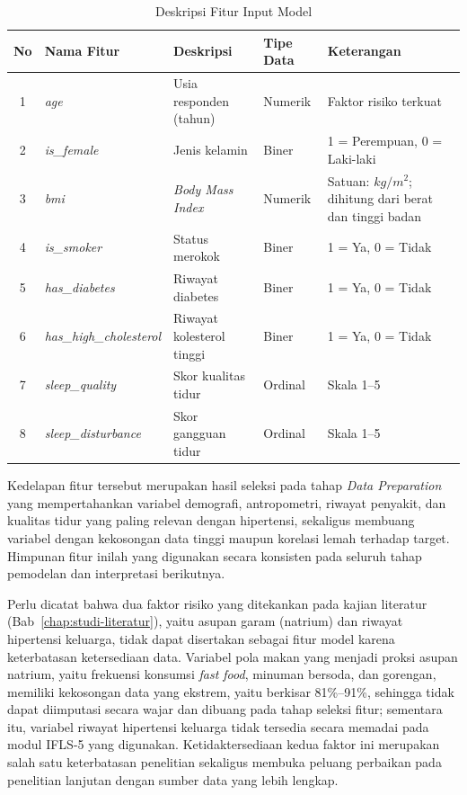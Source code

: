 \begin{table}[H]
    \centering
    \caption{Deskripsi Fitur Input Model}
    \label{tab:deskripsi-fitur}
    \small
    \begin{tabular}{|c|p{3.5cm}|p{4cm}|p{2cm}|p{4cm}|}
        \hline
        \textbf{No} & \textbf{Nama Fitur} & \textbf{Deskripsi} & \textbf{Tipe Data} & \textbf{Keterangan} \\
        \hline
        1 & \textit{age} & Usia responden (tahun) & Numerik & Faktor risiko terkuat \\
        \hline
        2 & \textit{is\_female} & Jenis kelamin & Biner & 1 = Perempuan, 0 = Laki-laki \\
        \hline
        3 & \textit{bmi} & \textit{Body Mass Index} & Numerik & Satuan: $kg/m^2$; dihitung dari berat dan tinggi badan \\
        \hline
        4 & \textit{is\_smoker} & Status merokok & Biner & 1 = Ya, 0 = Tidak \\
        \hline
        5 & \textit{has\_diabetes} & Riwayat diabetes & Biner & 1 = Ya, 0 = Tidak \\
        \hline
        6 & \textit{has\_high\_cholesterol} & Riwayat kolesterol tinggi & Biner & 1 = Ya, 0 = Tidak \\
        \hline
        7 & \textit{sleep\_quality} & Skor kualitas tidur & Ordinal & Skala 1--5 \\
        \hline
        8 & \textit{sleep\_disturbance} & Skor gangguan tidur & Ordinal & Skala 1--5 \\
        \hline
    \end{tabular}
\end{table}

Kedelapan fitur tersebut merupakan hasil seleksi pada tahap \emph{Data Preparation} yang mempertahankan variabel demografi, antropometri, riwayat penyakit, dan kualitas tidur yang paling relevan dengan hipertensi, sekaligus membuang variabel dengan kekosongan data tinggi maupun korelasi lemah terhadap target. Himpunan fitur inilah yang digunakan secara konsisten pada seluruh tahap pemodelan dan interpretasi berikutnya.

Perlu dicatat bahwa dua faktor risiko yang ditekankan pada kajian literatur (Bab~\ref{chap:studi-literatur}), yaitu asupan garam (natrium) dan riwayat hipertensi keluarga, tidak dapat disertakan sebagai fitur model karena keterbatasan ketersediaan data. Variabel pola makan yang menjadi proksi asupan natrium, yaitu frekuensi konsumsi \textit{fast food}, minuman bersoda, dan gorengan, memiliki kekosongan data yang ekstrem, yaitu berkisar 81\%--91\%, sehingga tidak dapat diimputasi secara wajar dan dibuang pada tahap seleksi fitur; sementara itu, variabel riwayat hipertensi keluarga tidak tersedia secara memadai pada modul IFLS-5 yang digunakan. Ketidaktersediaan kedua faktor ini merupakan salah satu keterbatasan penelitian sekaligus membuka peluang perbaikan pada penelitian lanjutan dengan sumber data yang lebih lengkap.

